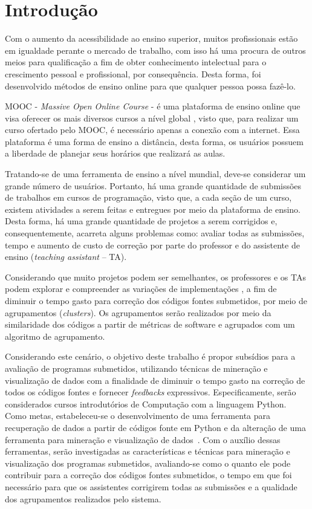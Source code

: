 \chapter{Introdução}
Com o aumento da acessibilidade ao ensino superior, muitos profissionais estão em
igualdade perante o mercado de trabalho, com isso há uma procura de outros meios
para qualificação a fim de obter conhecimento intelectual para o crescimento
pessoal e profissional, por consequência. Desta forma, foi desenvolvido métodos
de ensino online para que qualquer pessoa possa fazê-lo.

MOOC - \textit{Massive Open Online Course} - é uma plataforma de ensino online
que visa oferecer os mais diversos cursos a nível global \cite{Mehlenbacher:2012},
visto que, para realizar um curso ofertado pelo MOOC, é necessário apenas a conexão
com a internet. Essa plataforma é uma forma de ensino a distância, desta forma,
os usuários possuem a liberdade de planejar seus horários que realizará as aulas. 

Tratando-se de uma ferramenta de ensino a nível mundial, deve-se considerar um
grande número de usuários. Portanto, há uma grande quantidade de submissões de
trabalhos em cursos de programação, visto que, a cada seção de um curso, existem
atividades a serem feitas e entregues por meio da plataforma de ensino. Desta
forma, há uma grande quantidade de projetos a serem corrigidos e, consequentemente,
acarreta alguns problemas como: avaliar todas as submissões, tempo e aumento de
custo de correção por parte do professor e do assistente de ensino
(\textit{teaching assistant} – TA).



Considerando que muito projetos podem ser semelhantes, os professores e os TAs
podem explorar e compreender as variações de implementações \cite{Yin:2015}, a
fim de diminuir o tempo gasto para correção dos códigos fontes submetidos, por
meio de agrupamentos (\textit{clusters}). Os agrupamentos serão realizados por
meio da similaridade dos códigos a partir de métricas de software e agrupados
com um algoritmo de agrupamento.

Considerando este cenário, o objetivo deste trabalho é propor subsídios para a
avaliação de programas submetidos, utilizando técnicas de mineração e visualização
de dados com a finalidade de diminuir o tempo gasto na correção de todos os códigos
fontes e  fornecer \textit{feedbacks} expressivos. Especificamente, serão
considerados cursos introdutórios de Computação com a linguagem Python. Como
metas, estabeleceu-se o desenvolvimento de uma ferramenta para recuperação de
dados a partir de códigos fonte em Python e da alteração de uma ferramenta para
mineração e visualização de dados~\cite{Alencar}. Com o auxílio dessas ferramentas,
serão investigadas as características e técnicas para mineração e visualização
dos programas submetidos, avaliando-se como o quanto ele pode contribuir para
a correção dos códigos fontes submetidos, o tempo em que foi necessário para
que os assistentes corrigirem todas as submissões e a qualidade dos agrupamentos
realizados pelo sistema.

